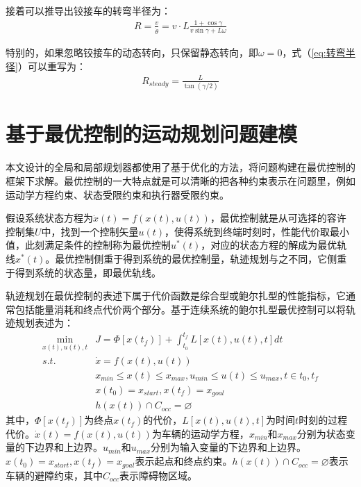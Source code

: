 \documentclass[master,academic]{ysuthesis} %
\begin{document}
	接着可以推导出铰接车的转弯半径为：
	\begin{equation}
		\begin{aligned}
			R = \frac{v}{\dot{\theta}} = v\cdot L \frac{1+\cos\gamma}{v\sin\gamma+L\omega }
		\end{aligned}
		\label{eq:转弯半径}
	\end{equation}


	特别的，如果忽略铰接车的动态转向，只保留静态转向，即$\omega=0$，式（\ref{eq:转弯半径}）可以重写为：
	\begin{equation}
		\begin{aligned}
			R_{steady} = \frac{L}{\tan(\gamma/2)} 
		\end{aligned}
	\end{equation}
		
	\section{基于最优控制的运动规划问题建模}
	本文设计的全局和局部规划器都使用了基于优化的方法，将问题构建在最优控制的框架下求解。最优控制的一大特点就是可以清晰的把各种约束表示在问题里，例如运动学方程约束、状态受限约束和执行器受限约束。
	
	假设系统状态方程为$\dot{x}(t)=f(x(t),u(t))$，最优控制就是从可选择的容许控制集$U$中，找到一个控制矢量$u(t)$，使得系统到终端时刻时，性能代价取最小值，此刻满足条件的控制称为最优控制$u^{*}(t)$，对应的状态方程的解成为最优轨线$x^{*}(t)$。最优控制侧重于得到系统的最优控制量，轨迹规划与之不同，它侧重于得到系统的状态量，即最优轨线。
	
	轨迹规划在最优控制的表述下属于代价函数是综合型或鲍尔扎型的性能指标，它通常包括能量消耗和终点代价两个部分。基于连续系统的鲍尔扎型最优控制可以将轨迹规划表述为：
	\begin{equation}
		\begin{aligned}
			\min_{x(t),u(t),t} &J = \Phi[x(t_f)]+\int_{t_0}^{t_f}L[x(t),u(t),t]dt\\
			s.t. \ \ \ &\dot{x} = f(x(t),u(t))\\
			&x_{min}\le x(t) \le x_{max},u_{min}\le u(t) \le u_{max},t \in{t_0,t_f}\\
			&x(t_0)=x_{start},x(t_f)=x_{goal}\\
			&h(x(t))\cap C_{occ}=\varnothing 
		\end{aligned}
	\end{equation}
	其中，$\Phi[x(t_f)]$为终点$x(t_f)$的代价，$L[x(t),u(t),t]$为时间$t$时刻的过程代价。$\dot{x}(t)=f(x(t),u(t))$为车辆的运动学方程，$x_{min}$和$x_{max}$分别为状态变量的下边界和上边界。$u_{min}$和$u_{max}$分别为输入变量的下边界和上边界。$x(t_0)=x_{start},x(t_f)=x_{goal}$表示起点和终点约束。$h(x(t))\cap C_{occ}=\varnothing$表示车辆的避障约束，其中$C_{occ}$表示障碍物区域。
	
\end{document}
